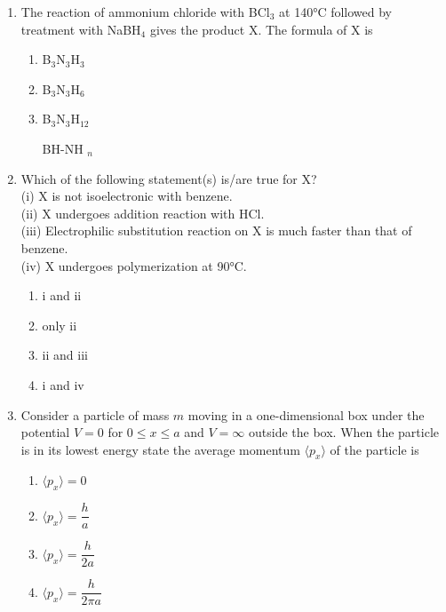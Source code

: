 \documentclass[journal,12pt,onecolumn]{IEEEtran}
\theoremstyle{remark}
\begin{document}
\begin{enumerate}
\item  The reaction of ammonium chloride with BCl$_3$ at 140°C followed by treatment with NaBH$_4$ gives the product X. The formula of X is \hfill{}
\begin{multicols}{2}
\begin{enumerate}[label=(\Alph*)]
    \item B$_3$N$_3$H$_3$
    \item B$_3$N$_3$H$_6$
    \item B$_3$N$_3$H$_{12}$
     \item   [BH-NH]$_n$
\end{enumerate}
\end{multicols}


\item  Which of the following statement(s) is/are true for X?\hfill{}\\
(i) X is not isoelectronic with benzene.\\
(ii) X undergoes addition reaction with HCl.\\
(iii) Electrophilic substitution reaction on X is much faster than that of benzene.\\
(iv) X undergoes polymerization at 90°C. \hfill{}
\begin{multicols}{2}
\begin{enumerate}[label=(\Alph*)]
    \item i and ii
    \item only ii
    \item ii and iii
    \item i and iv
\end{enumerate}
\end{multicols}


\item  Consider a particle of mass $m$ moving in a one-dimensional box under the potential $V=0$ for $0 \le x \le a$ and $V = \infty$ outside the box. When the particle is in its lowest energy state the average momentum $\langle p_x \rangle$ of the particle is \hfill{}
\begin{multicols}{2}
\begin{enumerate}[label=(\Alph*)]
    \item $\langle p_x \rangle = 0$
    \item $\langle p_x \rangle = \dfrac{h}{a}$
    \item $\langle p_x \rangle = \dfrac{h}{2a}$
    \item $\langle p_x \rangle = \dfrac{h}{2\pi a}$
\end{enumerate}
\end{multicols}



\end{enumerate}
\end{document}
